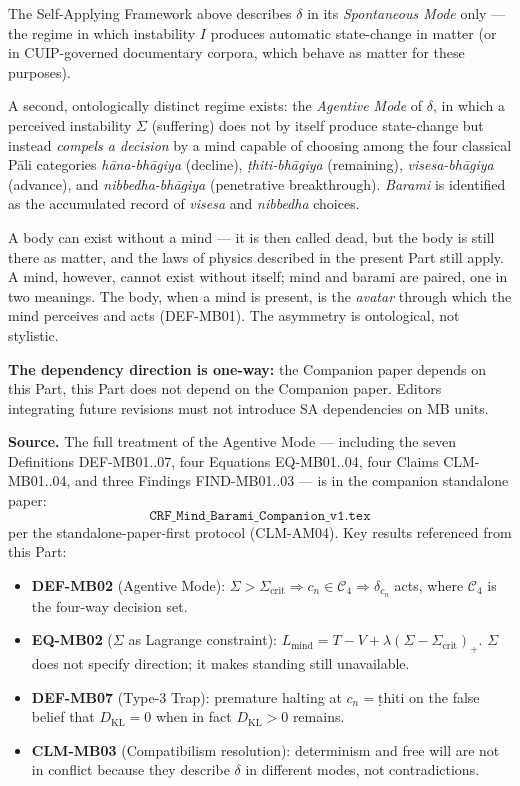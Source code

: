 \documentclass[12pt, a4paper]{article}
\begin{document}
The Self-Applying Framework above describes $\delta$ in its
\emph{Spontaneous Mode} only --- the regime in which instability $I$
produces automatic state-change in matter (or in CUIP-governed
documentary corpora, which behave as matter for these purposes).

A second, ontologically distinct regime exists: the \emph{Agentive
Mode} of $\delta$, in which a perceived instability $\Sigma$
(suffering) does not by itself produce state-change but instead
\emph{compels a decision} by a mind capable of choosing among the
four classical Pāli categories \emph{hāna-bhāgiya} (decline),
\emph{ṭhiti-bhāgiya} (remaining), \emph{visesa-bhāgiya} (advance),
and \emph{nibbedha-bhāgiya} (penetrative breakthrough). \emph{Barami}
is identified as the accumulated record of \emph{visesa} and
\emph{nibbedha} choices.

\begin{keybox}[title={Why Mind $\otimes$ Barami is a separate paper, not a section here}]
A body can exist without a mind --- it is then called dead, but the
body is still there as matter, and the laws of physics described in
the present Part still apply. A mind, however, cannot exist without
itself; mind and barami are paired, one in two meanings. The body,
when a mind is present, is the \emph{avatar} through which the mind
perceives and acts (DEF-MB01). The asymmetry is ontological, not
stylistic.

\smallskip
\textbf{The dependency direction is one-way:} the Companion paper
depends on this Part, this Part does not depend on the Companion
paper. Editors integrating future revisions must not introduce SA
dependencies on MB units.
\end{keybox}

\textbf{Source.} The full treatment of the Agentive Mode --- including
the seven Definitions DEF-MB01..07, four Equations EQ-MB01..04, four
Claims CLM-MB01..04, and three Findings FIND-MB01..03 --- is in the
companion standalone paper:
\[
  \texttt{CRF\_Mind\_Barami\_Companion\_v1.tex}
\]
per the standalone-paper-first protocol (CLM-AM04). Key results
referenced from this Part:
\begin{itemize}[leftmargin=*]
\item \textbf{DEF-MB02} (Agentive Mode): $\Sigma > \Sigma_{\mathrm{crit}}
\Rightarrow c_n \in \mathcal{C}_4 \Rightarrow \delta_{c_n}$ acts,
where $\mathcal{C}_4$ is the four-way decision set.
\item \textbf{EQ-MB02} ($\Sigma$ as Lagrange constraint):
$L_{\mathrm{mind}} = T - V + \lambda(\Sigma - \Sigma_{\mathrm{crit}})_+$.
$\Sigma$ does not specify direction; it makes standing still
unavailable.
\item \textbf{DEF-MB07} (Type-3 Trap): premature halting at
$c_n = \mathrm{ṭhiti}$ on the false belief that $D_{\mathrm{KL}} = 0$
when in fact $D_{\mathrm{KL}} > 0$ remains.
\item \textbf{CLM-MB03} (Compatibilism resolution): determinism and
free will are not in conflict because they describe $\delta$ in
different modes, not contradictions.
\end{itemize}
\end{document}
